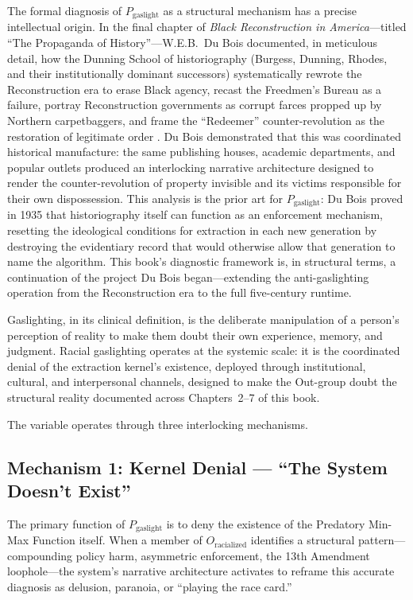 The formal diagnosis of $P_{\text{gaslight}}$ as a structural mechanism has a precise intellectual origin. In the final chapter of \textit{Black Reconstruction in America}---titled ``The Propaganda of History''---W.E.B.\ Du Bois documented, in meticulous detail, how the Dunning School of historiography (Burgess, Dunning, Rhodes, and their institutionally dominant successors) systematically rewrote the Reconstruction era to erase Black agency, recast the Freedmen's Bureau as a failure, portray Reconstruction governments as corrupt farces propped up by Northern carpetbaggers, and frame the ``Redeemer'' counter-revolution as the restoration of legitimate order \cite{dubois}. Du Bois demonstrated that this was coordinated historical manufacture: the same publishing houses, academic departments, and popular outlets produced an interlocking narrative architecture designed to render the counter-revolution of property invisible and its victims responsible for their own dispossession. This analysis is the prior art for $P_{\text{gaslight}}$: Du Bois proved in 1935 that historiography itself can function as an enforcement mechanism, resetting the ideological conditions for extraction in each new generation by destroying the evidentiary record that would otherwise allow that generation to name the algorithm. This book's diagnostic framework is, in structural terms, a continuation of the project Du Bois began---extending the anti-gaslighting operation from the Reconstruction era to the full five-century runtime.

Gaslighting, in its clinical definition, is the deliberate manipulation of a person's perception of reality to make them doubt their own experience, memory, and judgment. Racial gaslighting operates at the systemic scale: it is the coordinated denial of the extraction kernel's existence, deployed through institutional, cultural, and interpersonal channels, designed to make the Out-group doubt the structural reality documented across Chapters~2--7 of this book.

The variable operates through three interlocking mechanisms.

\subsection{Mechanism 1: Kernel Denial --- ``The System Doesn't Exist''}

The primary function of $P_{\text{gaslight}}$ is to deny the existence of the Predatory Min-Max Function itself. When a member of $O_{\text{racialized}}$ identifies a structural pattern---compounding policy harm, asymmetric enforcement, the 13th Amendment loophole---the system's narrative architecture activates to reframe this accurate diagnosis as delusion, paranoia, or ``playing the race card.''

